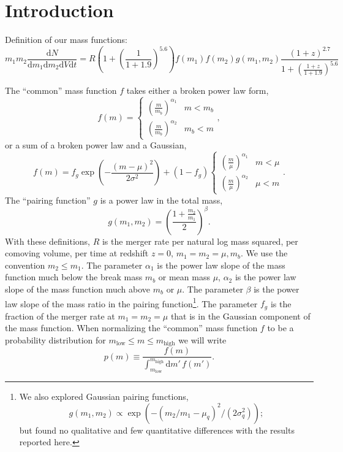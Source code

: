 \documentclass[modern]{aastex631}
\newcommand{\dd}{\ensuremath{\mathrm{d}}}
\begin{document}
\section{Introduction}

Definition of our mass functions:
\begin{equation}
    \label{eq:intensity-definition}
    m_1 m_2 \frac{\dd N}{\dd m_1 \dd m_2 \dd V \dd t} = R \left(1 + \left(\frac{1}{1 + 1.9}\right)^{5.6} \right) f\left( m_1 \right) f\left( m_2 \right) g(m_1, m_2) \frac{\left( 1 + z \right)^{2.7}}{1 + \left( \frac{1+z}{1+1.9} \right)^{5.6}}
\end{equation}

The ``common'' mass function $f$ takes either a broken power law form,
\begin{equation}
    f(m) = \begin{cases}
        \left( \frac{m}{m_b} \right)^{\alpha_1} & m < m_b \\
        \left( \frac{m}{m_b} \right)^{\alpha_2} & m_b < m
    \end{cases},
\end{equation}
or a sum of a broken power law and a Gaussian,
\begin{equation}
    f(m) = f_g \exp\left( - \frac{\left( m - \mu \right)^2}{2 \sigma^2} \right) + \left( 1 - f_g \right) 
    \begin{cases}
        \left( \frac{m}{\mu} \right)^{\alpha_1} & m < \mu \\
        \left( \frac{m}{\mu} \right)^{\alpha_2} & \mu < m
    \end{cases}.
\end{equation}
The ``pairing function'' \citep{Fishbach2020} $g$ is a power law in the total
mass,
\begin{equation}
    g(m_1, m_2) = \left( \frac{1 + \frac{m_2}{m_1}}{2} \right)^{\beta}.
\end{equation}
With these definitions, $R$ is the merger rate per natural log mass squared, per
comoving volume, per time at redshift $z = 0$, $m_1 = m_2 = \mu, m_b$.  We use
the convention $m_2 \leq m_1$.  The parameter $\alpha_1$ is the power law slope
of the mass function much below the break mass $m_b$ or mean mass $\mu$,
$\alpha_2$ is the power law slope of the mass function much above $m_b$ or
$\mu$.  The parameter $\beta$ is the power law slope of the mass ratio in the
pairing function\footnote{We also explored Gaussian pairing functions,
\begin{equation}
    g\left(m_1, m_2 \right) \propto \exp\left( - \left( m_2/m_1 - \mu_q \right)^2 /
\left( 2 \sigma_q^2 \right) \right);
\end{equation} 
but found no qualitative and few quantitative differences with the results
reported here.}.  The parameter $f_g$ is the fraction of the merger rate at $m_1
= m_2 = \mu$ that is in the Gaussian component of the mass function.  When
normalizing the ``common'' mass function $f$ to be a probability distribution
for $m_\mathrm{low} \leq m \leq m_\mathrm{high}$ we will write 
\begin{equation}
    \label{eq:pm-definition}
    p(m) \equiv \frac{f(m)}{\int_{m_\mathrm{low}}^{m_\mathrm{high}} \dd m' \, f(m')}.
\end{equation}
\end{document}
